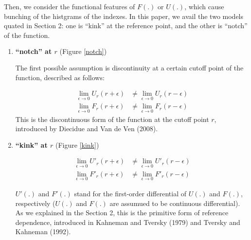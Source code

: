 \documentclass[dvipdfmx, 12pt]{article}
\begin{document}
Then, we consider the functional features of $F(.)$ or $U(.)$, which cause bunching of the histgrams of the indexes. In this paper, we avail the two models quated in Section 2: one is ``kink'' at the reference point, and the other is ``notch'' of the function.

\begin{enumerate}
  \item \textbf{``notch'' at $r$} (Figure \ref{notch})

  The first possible assumption is discontinuity at a certain cutoff point of the function, described as follows:

  \begin{align*}
    \lim_{\epsilon \to 0} U_r (r + \epsilon) & \neq
    \lim_{\epsilon \to 0} U_r (r - \epsilon) \\
    \lim_{\epsilon \to 0} F_r (r + \epsilon) & \neq
    \lim_{\epsilon \to 0} F_r (r - \epsilon)
  \end{align*}
  This is the discontinuous form of the function at the cutoff point $r$, introduced by Diecidue and Van de Ven (2008).

  \item \textbf{``kink'' at $r$} (Figure \ref{kink})

  \begin{align*}
    \lim_{\epsilon \to 0} U'_r (r + \epsilon) & \neq
    \lim_{\epsilon \to 0} U'_r (r - \epsilon) \\
    \lim_{\epsilon \to 0} F'_r (r + \epsilon) & \neq
    \lim_{\epsilon \to 0} F'_r (r - \epsilon)
  \end{align*}

  $U'(.)$ and $F'(.)$ stand for the first-order differential of $U(.)$ and $F(.)$, respectively ($U(.)$ and $F(.)$ are assumued to be continuous differential). As we explained in the Section 2, this is the primitive form of reference dependence, introduced in Kahneman and Tversky (1979) and Tversky and Kahneman (1992).
\end{enumerate}
\end{document}
